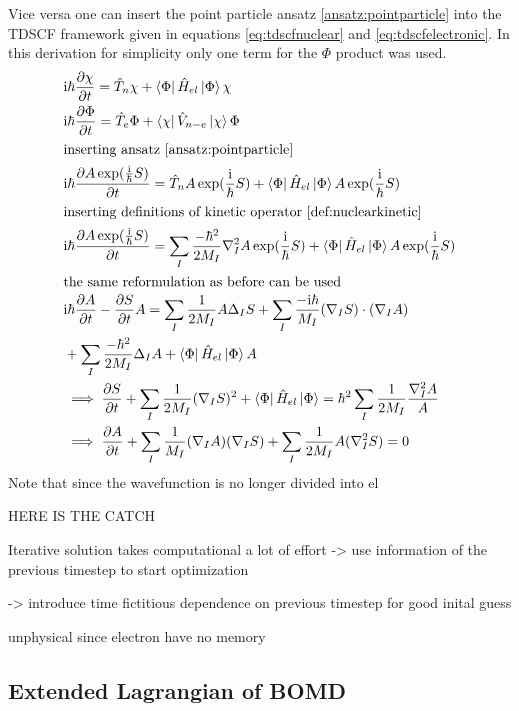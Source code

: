 \documentclass[12pt]{scrartcl}
\begin{document}
Vice versa one can insert the point particle ansatz \ref{ansatz:pointparticle} into the TDSCF framework given in equations \ref{eq:tdscfnuclear} and \ref{eq:tdscfelectronic}. In this derivation for simplicity only one term for the $\Phi$ product was used.
\begin{align*}
&\mathrm{i}\hbar \frac{\partial \chi}{\partial t} = \hat{T}_n\chi+  \Bra{\Phi} \hat{H}_{el}\Ket{\Phi} \chi\\
&\mathrm{i}\hbar \frac{\partial\Phi}{\partial t}= \hat{T}_e \Phi + \Bra{\chi} \hat{V}_{n-e} \Ket{\chi} \Phi\\
\intertext{inserting ansatz \ref{ansatz:pointparticle}}
&\mathrm{i}\hbar \frac{\partial A\exp(\frac{\mathrm{i}}{\hbar}S)}{\partial t} = \hat{T}_nA\exp(\frac{\mathrm{i}}{\hbar}S)+  \Bra{\Phi} \hat{H}_{el}\Ket{\Phi} A\exp(\frac{\mathrm{i}}{\hbar}S)\\
\intertext{inserting definitions of kinetic operator \ref{def:nuclearkinetic}}
&\mathrm{i}\hbar \frac{\partial A\exp(\frac{\mathrm{i}}{\hbar}S)}{\partial t} = \sum_I \frac{-\hbar^2}{2M_I}\nabla_I^2 A\exp(\frac{\mathrm{i}}{\hbar}S)+  \Bra{\Phi} \hat{H}_{el}\Ket{\Phi} A\exp(\frac{\mathrm{i}}{\hbar}S)\\
\intertext{the same reformulation as before can be used}
&\mathrm{i}\hbar\frac{\partial A}{\partial t}-\frac{\partial S}{\partial t}A=\sum_I\frac{1}{2M_I}A\Delta_IS+\sum_I\frac{-\mathrm{i}\hbar}{M_I}(\nabla_IS)\cdot(\nabla_IA)\\
&+\sum_I\frac{-\hbar^2}{2M_I}\Delta_IA+\Bra{\Phi} \hat{H}_{el}\Ket{\Phi} A\\
&\implies\frac{\partial S}{\partial t} + \sum_I\frac{1}{2M_I}(\nabla_IS)^2+\Bra{\Phi} \hat{H}_{el}\Ket{\Phi}=\hbar^2\sum_I\frac{1}{2M_I}\frac{\nabla_I^2A}{A}\\
&\implies\frac{\partial A}{\partial t}+\sum_I\frac{1}{M_I}(\nabla_IA)(\nabla_IS)+\sum_I\frac{1}{2M_I}A(\nabla_I^2S)=0
\end{align*}
Note that since the wavefunction is no longer divided into el


HERE IS THE CATCH


Iterative solution takes computational a lot of effort -> use information of the previous timestep to start optimization

-> introduce time fictitious dependence on previous timestep for good inital guess

unphysical since electron have no memory

\subsection{Extended Lagrangian of BOMD}
\end{document}
